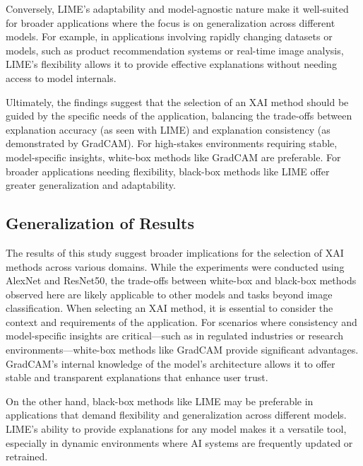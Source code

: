 \documentclass{article}
\begin{document}
Conversely, LIME’s adaptability and model-agnostic nature make it well-suited for broader applications where the focus is on generalization across different models. For example, in applications involving rapidly changing datasets or models, such as product recommendation systems or real-time image analysis, LIME’s flexibility allows it to provide effective explanations without needing access to model internals.

Ultimately, the findings suggest that the selection of an XAI method should be guided by the specific needs of the application, balancing the trade-offs between explanation accuracy (as seen with LIME) and explanation consistency (as demonstrated by GradCAM). For high-stakes environments requiring stable, model-specific insights, white-box methods like GradCAM are preferable. For broader applications needing flexibility, black-box methods like LIME offer greater generalization and adaptability.

\subsection{Generalization of Results}

The results of this study suggest broader implications for the selection of XAI methods across various domains. While the experiments were conducted using AlexNet and ResNet50, the trade-offs between white-box and black-box methods observed here are likely applicable to other models and tasks beyond image classification.
When selecting an XAI method, it is essential to consider the context and requirements of the application. For scenarios where consistency and model-specific insights are critical—such as in regulated industries or research environments—white-box methods like GradCAM provide significant advantages. GradCAM’s internal knowledge of the model’s architecture allows it to offer stable and transparent explanations that enhance user trust.

On the other hand, black-box methods like LIME may be preferable in applications that demand flexibility and generalization across different models. LIME’s ability to provide explanations for any model makes it a versatile tool, especially in dynamic environments where AI systems are frequently updated or retrained.





\appendix
\end{document}
